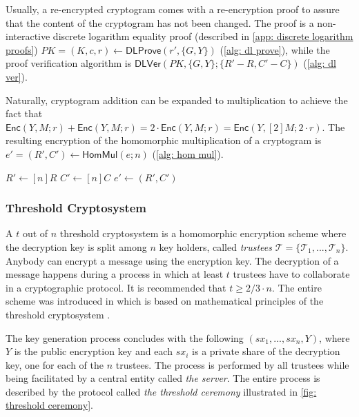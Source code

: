 Usually, a re-encrypted cryptogram comes with a re-encryption proof to assure that the content of the cryptogram has not been changed. The proof is a non-interactive discrete logarithm equality proof (described in \cref{app: discrete logarithm proofs}) $PK = (K, c, r) \gets \mathsf{DLProve} (r', \{ G, Y \})$ (\cref{alg: dl prove}), while the proof verification algorithm is $\mathsf{DLVer} (PK, \{ G, Y \}; \{ R'-R, C'-C \})$ (\cref{alg: dl ver}).

Naturally, cryptogram addition can be expanded to multiplication to achieve the fact that $\mathsf{Enc}(Y, M; r) + \mathsf{Enc}(Y, M; r) = 2 \cdot \mathsf{Enc}(Y, M; r) = \mathsf{Enc}(Y, [2]M; 2 \cdot r)$. The resulting encryption of the homomorphic multiplication of a cryptogram is $e' = (R', C') \gets \mathsf{HomMul}(e; n)$ (\cref{alg: hom mul}).

\begin{algorithm}[ht]
    \DontPrintSemicolon
    \caption{$\mathsf{HomMul} (e; n)$}
    \label{alg: hom mul}
    
    $R' \gets [n]R$ \;
    $C' \gets [n]C$ \;
    $e' \gets (R', C')$ \;
     
\end{algorithm}


\subsubsection{Threshold Cryptosystem} \label{app: threshold cryptosystem}
A $t$ out of $n$ threshold cryptosystem is a homomorphic encryption scheme where the decryption key is split among $n$ key holders, called \textit{trustees} $\boldsymbol{\mathcal{T}} = \{ \mathcal{T}_1, ..., \mathcal{T}_n \}$. Anybody can encrypt a message using the encryption key. The decryption of a message happens during a process in which at least $t$ trustees have to collaborate in a cryptographic protocol. It is recommended that $t \geq 2/3 \cdot n$. The entire scheme was introduced in \cite{Pedersen91} which is based on mathematical principles of the threshold cryptosystem \cite{Desmedt89, Shamir79}.

The key generation process concludes with the following $(sx_1, ..., sx_n, Y)$, where $Y$ is the public encryption key and each $sx_i$ is a private share of the decryption key, one for each of the $n$ trustees. The process is performed by all trustees while being facilitated by a central entity called \textit{the server}. The entire process is described by the protocol called \textit{the threshold ceremony} illustrated in \cref{fig: threshold ceremony}.

